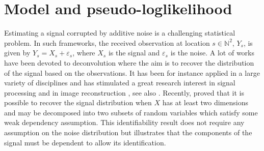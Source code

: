 \documentclass[lettersize,journal]{IEEEtran}
\begin{document}
\section{Model and pseudo-loglikelihood}
\label{sec:model}

Estimating a signal corrupted by additive noise is a challenging statistical problem. In such frameworks, the received observation at location $s\in\mathbb{N}^2$, $Y_s$, is given by $Y_s = X_s + \varepsilon_s$,  where $X_s$ is the signal and $\varepsilon_s$ is the noise. A lot of works have been devoted to deconvolution where the aim is to recover the distribution of the signal based on the observations. It has been for instance applied in a large variety of disciplines and has stimulated a great research interest in signal processing \cite{moulines1997maximum,attias1998blind} and in image reconstruction \cite{kundur1996blind,campisi2017blind}, see also  \cite{meister:2009}. Recently, \cite{gassiat:lecorff:lehericy:2021} proved that it is possible to recover the signal distribution when $X$ has at least two dimensions and may be decomposed into two subsets of random variables which satisfy some weak dependency assumption. This identifiability result does not require any assumption on the noise distribution but illustrates that the components of the signal must be dependent to allow its identification. %
\end{document}
